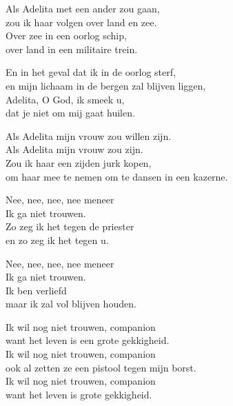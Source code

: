 \clearpage
\begin{translation}[Adelita]
Als Adelita met een ander zou gaan,\\
zou ik haar volgen over land en zee.\\
Over zee in een oorlog schip,\\
over land in een militaire trein.\vspace{\wlskip}

En in het geval dat ik in de oorlog sterf,\\
en mijn lichaam in de bergen zal blijven liggen,\\
Adelita, O God, ik smeek u,\\
dat je niet om mij gaat huilen.\vspace{\wlskip}

Als Adelita mijn vrouw zou willen zijn.\\
Als Adelita mijn vrouw zou zijn.\\
Zou ik haar een zijden jurk kopen,\\
om haar mee te nemen om te dansen in een kazerne.
\end{translation}

\begin{translation}[No Me Caso]
Nee, nee, nee, nee meneer\\
Ik ga niet trouwen.\\
Zo zeg ik het tegen de priester\\
en zo zeg ik het tegen u.\vspace{\wlskip}

Nee, nee, nee, nee meneer\\
Ik ga niet trouwen.\\
Ik ben verliefd\\
maar ik zal vol blijven houden.\vspace{\wlskip}

Ik wil nog niet trouwen, companion\\
want het leven is een grote gekkigheid.\\
Ik wil nog niet trouwen, companion\\
ook al zetten ze een pistool tegen mijn borst.\\
Ik wil nog niet trouwen, companion\\
want het leven is grote gekkigheid.\\

\end{translation}
